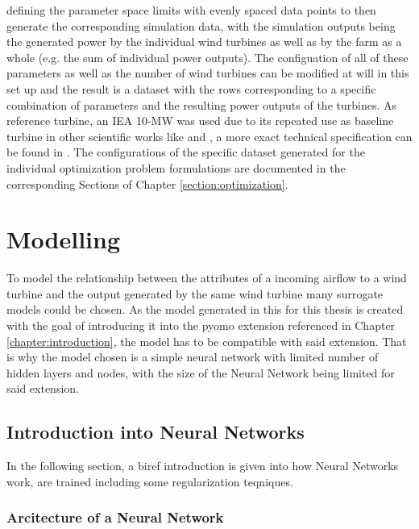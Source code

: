  defining the parameter space limits with evenly spaced data points to then generate the corresponding simulation data, with the simulation outputs being the generated power by the individual wind turbines as well as by the farm as a whole (e.g. the sum of individual power outputs). The configuation of all of these parameters as well as the number of wind turbines can be modified at will in this set up and the result is a dataset with the rows corresponding to a specific combination of parameters and the resulting power outputs of the turbines. As reference turbine, an IEA 10-MW was used due to its repeated use as baseline turbine in other scientific works like \cite{Madsen2022} and \cite{Kainz2024IEA} , a more exact technical specification can be found in \cite{Bortolotti2019}. The configurations of the specific dataset generated for the individual optimization problem formulations are documented in the corresponding Sections of Chapter \ref{section:optimization}.


\section{Modelling} \label{sec:modelling}

To model the relationship between the attributes of a incoming airflow to a wind turbine and the output generated by the same wind turbine many surrogate models could be chosen. As the model generated in this for this thesis is created with the goal of introducing it into the pyomo extension referenced in Chapter \ref{chapter:introduction}, the model has to be compatible with said extension. That is why the model chosen is a simple neural network with limited number of hidden layers and nodes, with the size of the Neural Network being limited for said extension. 

\subsection{Introduction into Neural Networks}

In the following section, a biref introduction is given into how Neural Networks work, are trained including some regularization teqniques.

\subsubsection{Arcitecture of a Neural Network}


